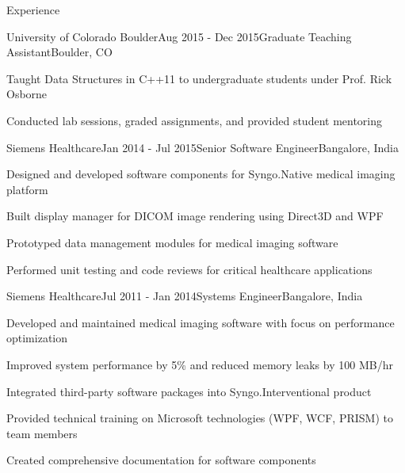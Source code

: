 \begin{rSection}{Experience}
\begin{rSubsection}{University of Colorado Boulder}{Aug 2015 - Dec 2015}{Graduate Teaching Assistant}{Boulder, CO}
\item Taught Data Structures in C++11 to undergraduate students under Prof. Rick Osborne
\item Conducted lab sessions, graded assignments, and provided student mentoring
\end{rSubsection}

\begin{rSubsection}{Siemens Healthcare}{Jan 2014 - Jul 2015}{Senior Software Engineer}{Bangalore, India}
\item Designed and developed software components for Syngo.Native medical imaging platform
\item Built display manager for DICOM image rendering using Direct3D and WPF
\item Prototyped data management modules for medical imaging software
\item Performed unit testing and code reviews for critical healthcare applications
\end{rSubsection}

\begin{rSubsection}{Siemens Healthcare}{Jul 2011 - Jan 2014}{Systems Engineer}{Bangalore, India}
\item Developed and maintained medical imaging software with focus on performance optimization
\item Improved system performance by 5\% and reduced memory leaks by 100 MB/hr
\item Integrated third-party software packages into Syngo.Interventional product
\item Provided technical training on Microsoft technologies (WPF, WCF, PRISM) to team members
\item Created comprehensive documentation for software components
\end{rSubsection}

\end{rSection}
